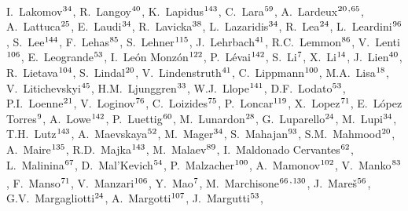 \begin{flushleft}
I.~Lakomov$^\textrm{\scriptsize 34}$,
R.~Langoy$^\textrm{\scriptsize 40}$,
K.~Lapidus$^\textrm{\scriptsize 143}$,
C.~Lara$^\textrm{\scriptsize 59}$,
A.~Lardeux$^\textrm{\scriptsize 20}$\textsuperscript{,}$^\textrm{\scriptsize 65}$,
A.~Lattuca$^\textrm{\scriptsize 25}$,
E.~Laudi$^\textrm{\scriptsize 34}$,
R.~Lavicka$^\textrm{\scriptsize 38}$,
L.~Lazaridis$^\textrm{\scriptsize 34}$,
R.~Lea$^\textrm{\scriptsize 24}$,
L.~Leardini$^\textrm{\scriptsize 96}$,
S.~Lee$^\textrm{\scriptsize 144}$,
F.~Lehas$^\textrm{\scriptsize 85}$,
S.~Lehner$^\textrm{\scriptsize 115}$,
J.~Lehrbach$^\textrm{\scriptsize 41}$,
R.C.~Lemmon$^\textrm{\scriptsize 86}$,
V.~Lenti$^\textrm{\scriptsize 106}$,
E.~Leogrande$^\textrm{\scriptsize 53}$,
I.~Le\'{o}n Monz\'{o}n$^\textrm{\scriptsize 122}$,
P.~L\'{e}vai$^\textrm{\scriptsize 142}$,
S.~Li$^\textrm{\scriptsize 7}$,
X.~Li$^\textrm{\scriptsize 14}$,
J.~Lien$^\textrm{\scriptsize 40}$,
R.~Lietava$^\textrm{\scriptsize 104}$,
S.~Lindal$^\textrm{\scriptsize 20}$,
V.~Lindenstruth$^\textrm{\scriptsize 41}$,
C.~Lippmann$^\textrm{\scriptsize 100}$,
M.A.~Lisa$^\textrm{\scriptsize 18}$,
V.~Litichevskyi$^\textrm{\scriptsize 45}$,
H.M.~Ljunggren$^\textrm{\scriptsize 33}$,
W.J.~Llope$^\textrm{\scriptsize 141}$,
D.F.~Lodato$^\textrm{\scriptsize 53}$,
P.I.~Loenne$^\textrm{\scriptsize 21}$,
V.~Loginov$^\textrm{\scriptsize 76}$,
C.~Loizides$^\textrm{\scriptsize 75}$,
P.~Loncar$^\textrm{\scriptsize 119}$,
X.~Lopez$^\textrm{\scriptsize 71}$,
E.~L\'{o}pez Torres$^\textrm{\scriptsize 9}$,
A.~Lowe$^\textrm{\scriptsize 142}$,
P.~Luettig$^\textrm{\scriptsize 60}$,
M.~Lunardon$^\textrm{\scriptsize 28}$,
G.~Luparello$^\textrm{\scriptsize 24}$,
M.~Lupi$^\textrm{\scriptsize 34}$,
T.H.~Lutz$^\textrm{\scriptsize 143}$,
A.~Maevskaya$^\textrm{\scriptsize 52}$,
M.~Mager$^\textrm{\scriptsize 34}$,
S.~Mahajan$^\textrm{\scriptsize 93}$,
S.M.~Mahmood$^\textrm{\scriptsize 20}$,
A.~Maire$^\textrm{\scriptsize 135}$,
R.D.~Majka$^\textrm{\scriptsize 143}$,
M.~Malaev$^\textrm{\scriptsize 89}$,
I.~Maldonado Cervantes$^\textrm{\scriptsize 62}$,
L.~Malinina$^\textrm{\scriptsize 67}$,
D.~Mal'Kevich$^\textrm{\scriptsize 54}$,
P.~Malzacher$^\textrm{\scriptsize 100}$,
A.~Mamonov$^\textrm{\scriptsize 102}$,
V.~Manko$^\textrm{\scriptsize 83}$,
F.~Manso$^\textrm{\scriptsize 71}$,
V.~Manzari$^\textrm{\scriptsize 106}$,
Y.~Mao$^\textrm{\scriptsize 7}$,
M.~Marchisone$^\textrm{\scriptsize 66}$\textsuperscript{,}$^\textrm{\scriptsize 130}$,
J.~Mare\v{s}$^\textrm{\scriptsize 56}$,
G.V.~Margagliotti$^\textrm{\scriptsize 24}$,
A.~Margotti$^\textrm{\scriptsize 107}$,
J.~Margutti$^\textrm{\scriptsize 53}$,

\end{flushleft}
